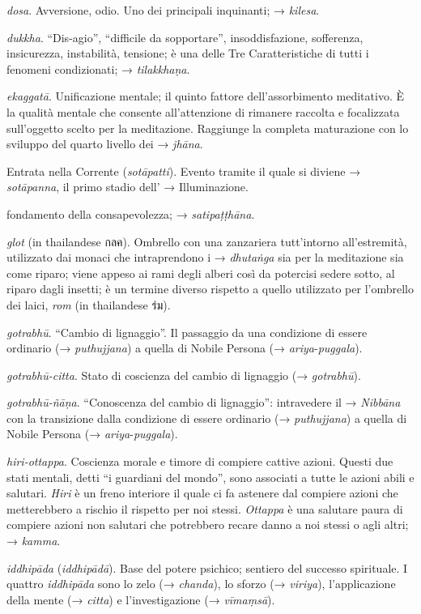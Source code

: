 \emph{dosa}. Avversione, odio. Uno dei principali inquinanti; →
\emph{kilesa}.

\emph{dukkha}. ``Dis-agio'', ``difficile da sopportare'',
insoddisfazione, sofferenza, insicurezza, instabilità, tensione; è una
delle Tre Caratteristiche di tutti i fenomeni condizionati; →
\emph{tilakkhaṇa}.

\emph{ekaggatā}. Unificazione mentale; il quinto fattore
dell'assorbimento meditativo. È la qualità mentale che consente
all'attenzione di rimanere raccolta e focalizzata sull'oggetto scelto
per la meditazione. Raggiunge la completa maturazione con lo sviluppo
del quarto livello dei → \emph{jhāna}.

Entrata nella Corrente (\emph{sotāpatti}). Evento tramite il quale si
diviene → \emph{sotāpanna}, il primo stadio dell' → Illuminazione.

fondamento della consapevolezza; → \emph{satipaṭṭhāna}.

\emph{glot} (in thailandese กลค). Ombrello con una zanzariera
tutt'intorno all'estremità, utilizzato dai monaci che intraprendono i →
\emph{dhutaṅga} sia per la meditazione sia come riparo; viene appeso ai
rami degli alberi così da potercisi sedere sotto, al riparo dagli
insetti; è un termine diverso rispetto a quello utilizzato per
l'ombrello dei laici, \emph{rom} (in thailandese ร่ม).

\emph{gotrabhū}. ``Cambio di lignaggio''. Il passaggio da una condizione
di essere ordinario (→ \emph{puthujjana}) a quella di Nobile Persona (→
\emph{ariya}-\emph{puggala}).

\emph{gotrabhū-citta}. Stato di coscienza del cambio di lignaggio (→
\emph{gotrabhū}).

\emph{gotrabhū-ñāṇa}. ``Conoscenza del cambio di lignaggio'':
intravedere il → \emph{Nibbāna} con la transizione dalla condizione di
essere ordinario (→ \emph{puthujjana}) a quella di Nobile Persona (→
\emph{ariya}-\emph{puggala}).

\emph{hiri-ottappa}. Coscienza morale e timore di compiere cattive
azioni. Questi due stati mentali, detti ``i guardiani del mondo'', sono
associati a tutte le azioni abili e salutari. \emph{Hiri} è un freno
interiore il quale ci fa astenere dal compiere azioni che metterebbero a
rischio il rispetto per noi stessi. \emph{Ottappa} è una salutare paura
di compiere azioni non salutari che potrebbero recare danno a noi stessi
o agli altri; → \emph{kamma}.

\emph{iddhipāda} (\emph{iddhipādā}). Base del potere psichico; sentiero
del successo spirituale. I quattro \emph{iddhipāda} sono lo zelo (→
\emph{chanda}), lo sforzo (→ \emph{viriya}), l'applicazione della mente
(→ \emph{citta}) e l'investigazione (→ \emph{vīmaṃsā}).

